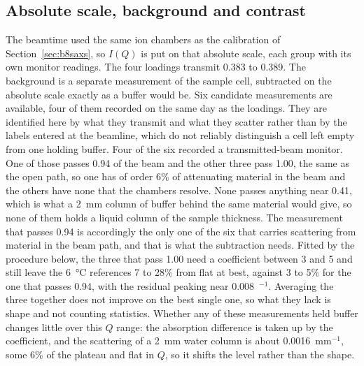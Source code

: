 \documentclass[11pt]{article}
\newcommand{\Ainv}{\text{\AA}$^{-1}$}
\begin{document}
\subsection{Absolute scale, background and contrast}
\label{sec:tdepbg}
The beamtime used the same ion chambers as the calibration of Section~\ref{sec:b8saxs}, so $I(Q)$ is put on that absolute scale, each group with its own monitor readings. The four loadings transmit 0.383 to 0.389. The background is a separate measurement of the sample cell, subtracted on the absolute scale exactly as a buffer would be. Six candidate measurements are available, four of them recorded on the same day as the loadings. They are identified here by what they transmit and what they scatter rather than by the labels entered at the beamline, which do not reliably distinguish a cell left empty from one holding buffer. Four of the six recorded a transmitted-beam monitor. One of those passes 0.94 of the beam and the other three pass 1.00, the same as the open path, so one has of order 6\% of attenuating material in the beam and the others have none that the chambers resolve. None passes anything near 0.41, which is what a \SI{2}{\milli\meter} column of buffer behind the same material would give, so none of them holds a liquid column of the sample thickness. The measurement that passes 0.94 is accordingly the only one of the six that carries scattering from material in the beam path, and that is what the subtraction needs. Fitted by the procedure below, the three that pass 1.00 need a coefficient between 3 and 5 and still leave the \SI{6}{\degreeCelsius} references 7 to 28\% from flat at best, against 3 to 5\% for the one that passes 0.94, with the residual peaking near 0.008~\Ainv. Averaging the three together does not improve on the best single one, so what they lack is shape and not counting statistics. Whether any of these measurements held buffer changes little over this $Q$ range: the absorption difference is taken up by the coefficient, and the scattering of a \SI{2}{\milli\meter} water column is about 0.0016~mm$^{-1}$, some 6\% of the plateau and flat in $Q$, so it shifts the level rather than the shape.
\end{document}
